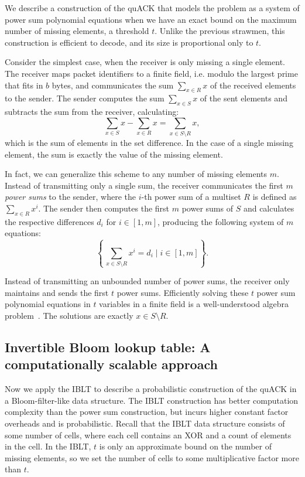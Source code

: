 We describe a construction of the quACK that models the problem as a system of
power sum polynomial equations when we have an exact bound on the maximum
number of missing elements, a threshold $t$. Unlike the previous strawmen, this
construction is efficient to decode, and its size is proportional only to $t$.

Consider the simplest case, when the receiver is only missing a single element.
The receiver maps packet identifiers to a finite field,
i.e. modulo the largest prime that fits in $b$ bytes,
 and communicates the sum $\sum_{x \in R} x$ of the received
elements to
the sender. The sender computes the sum $\sum_{x \in S} x$ of the sent elements
and subtracts the sum from the receiver, calculating:
\[
    \sum_{x \in S} x - \sum_{x \in R} x = \sum_{x \in S\setminus R} x,
\]
which is the sum of elements in the set difference. In the case of a single
missing element, the sum is exactly the value of the missing element.

In fact, we can generalize this scheme to any number of missing elements $m$.
Instead of transmitting only a single sum, the receiver communicates
the first $m$ \emph{power sums} to the sender, where the $i$-th power sum of a
multiset $R$ is defined as $\sum_{x \in R} x^i$.
The sender then computes the first $m$ power sums of $S$ and calculates the
respective differences $d_i$ for $i \in [1,m]$, producing the following
system of $m$ equations:
\[
    \left\{\, \sum_{x \in S\setminus R} x^i = d_i \mid i \in [1,m] \right\}.
\]

Instead of transmitting an unbounded number of power sums, the receiver only
maintains and sends the first $t$ power sums. Efficiently solving these $t$
power sum polynomial equations in $t$ variables in a finite field is a
well-understood algebra problem~\cite{eppstein2011straggler}. The solutions are
exactly $x \in S \setminus R$.

\subsection{Invertible Bloom lookup table: A computationally scalable approach}
\label{sec:quack:constructions:iblt}

Now we apply the IBLT to describe a probabilistic construction of the quACK in
a Bloom-filter-like data structure. The IBLT construction has better computation
complexity than the power sum construction, but incurs higher constant factor
overheads and is probabilistic.
Recall that the IBLT data structure consists of some number of cells, where each
cell contains an XOR and a count of elements in the cell. In the IBLT, $t$ is
only an approximate bound on the number of missing elements, so we set the
number of cells to some multiplicative factor more than $t$.

